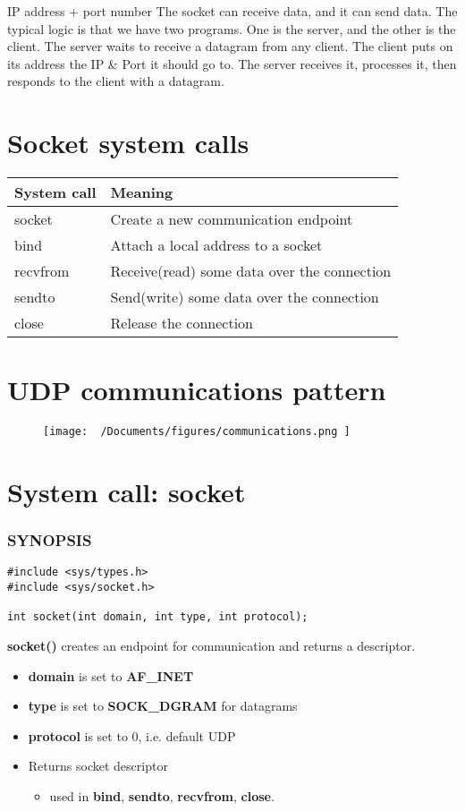 \documentclass{report}
\begin{document}
\noindent IP address + port number
\bigbreak \noindent
The socket can receive data, and it can send data. The typical logic is that we have two programs. One is the server, and the other is the client. The server waits to receive a datagram from any client. The client puts on its address the IP \& Port it should go to. The server receives it, processes it, then responds to the client with a datagram.
\section{Socket system calls}
\begin{center}
\begin{tabular}{|>{\ttfamily}l|l|}
\hline
\textbf{System call} & \textbf{Meaning} \\
\hline
socket & Create a new communication endpoint \\
\hline
bind & Attach a local address to a socket \\
\hline
recvfrom & Receive(read) some data over the connection \\
\hline
sendto & Send(write) some data over the connection \\
\hline
close & Release the connection \\
\hline
\end{tabular}
\end{center}
\section{UDP communications pattern}
\begin{figure}[H]
\centering
\texttt{[image:  ~/Documents/figures/communications.png ]}
\end{figure}
\section{System call: socket}

\subsubsection*{SYNOPSIS}
\begin{verbatim}
#include <sys/types.h>
#include <sys/socket.h>

int socket(int domain, int type, int protocol);
\end{verbatim}
\textbf{socket()} creates an endpoint for communication and returns a descriptor.
\begin{itemize}
\item \textbf{domain} is set to \textbf{AF\_INET}
\item \textbf{type} is set to \textbf{SOCK\_DGRAM} for datagrams
\item \textbf{protocol} is set to 0, i.e. default UDP
\item Returns socket descriptor
  \begin{itemize}[label=$\circ$]
    \item used in \textbf{bind}, \textbf{sendto}, \textbf{recvfrom}, \textbf{close}.
  \end{itemize}
\end{itemize}
\end{document}
